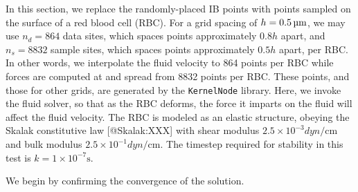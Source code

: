 In this section, we replace the randomly-placed IB points with points sampled
on the surface of a red blood cell (RBC). For a grid spacing of $h=0.5\um$, we
may use $n_d = 864$ data sites, which spaces points approximately $0.8h$ apart,
and $n_s = 8832$ sample sites, which spaces points approximately $0.5h$ apart,
per RBC. In other words, we interpolate the fluid velocity to 864 points per
RBC while forces are computed at and spread from 8832 points per RBC. These
points, and those for other grids, are generated by the \texttt{KernelNode}
library. Here, we invoke the fluid solver, so that as the RBC deforms, the
force it imparts on the fluid will affect the fluid velocity. The RBC is
modeled as an elastic structure, obeying the Skalak constitutive law
[@Skalak:XXX] with shear modulus $2.5\times10^{-3}\si{dyn\per\centi\meter}$ and
bulk modulus $2.5\times10^{-1}\si{dyn\per\centi\meter}$. The timestep required
for stability in this test is $k=1\times 10^{-7}\si{\second}$.

We begin by confirming the convergence of the solution.




